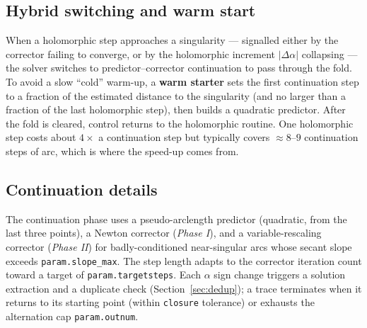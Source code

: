 \documentclass[11pt,a4paper]{article}
\newcommand{\code}[1]{\texttt{#1}}
\begin{document}
\subsection{Hybrid switching and warm start}
When a holomorphic step approaches a singularity --- signalled either by the corrector
failing to converge, or by the holomorphic increment $|\Delta\alpha|$ collapsing --- the
solver switches to predictor--corrector continuation to pass through the fold. To avoid a
slow ``cold'' warm-up, a \textbf{warm starter} sets the first continuation step to a
fraction of the estimated distance to the singularity (and no larger than a fraction of
the last holomorphic step), then builds a quadratic predictor. After the fold is cleared,
control returns to the holomorphic routine. One holomorphic step costs about
$4\times$ a continuation step but typically covers $\approx 8$--$9$ continuation steps of
arc, which is where the speed-up comes from.

\subsection{Continuation details}
The continuation phase uses a pseudo-arclength predictor (quadratic, from the last three
points), a Newton corrector (\emph{Phase I}), and a variable-rescaling corrector
(\emph{Phase II}) for badly-conditioned near-singular arcs whose secant slope exceeds
\code{param.slope_max}. The step length adapts to the corrector iteration count toward a
target of \code{param.targetsteps}. Each $\alpha$ sign change triggers a solution
extraction and a duplicate check (Section~\ref{sec:dedup}); a trace terminates when it returns to its starting
point (within \code{closure} tolerance) or exhausts the alternation cap
\code{param.outnum}.
\end{document}
